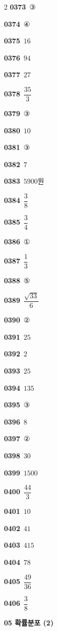 \documentclass[10pt,a4paper]{article}
\begin{document}
\begin{multicols}{2}
\noindent\textbf{0373}\ ③\par
\noindent\textbf{0374}\ ④\par
\noindent\textbf{0375}\ $16$\par
\noindent\textbf{0376}\ $94$\par
\noindent\textbf{0377}\ $27$\par
\noindent\textbf{0378}\ $\dfrac{35}{3}$\par
\noindent\textbf{0379}\ ③\par
\noindent\textbf{0380}\ $10$\par
\noindent\textbf{0381}\ ③\par
\noindent\textbf{0382}\ $7$\par
\noindent\textbf{0383}\ $5900$원\par
\noindent\textbf{0384}\ $\dfrac{3}{8}$\par
\noindent\textbf{0385}\ $\dfrac{3}{4}$\par
\noindent\textbf{0386}\ ①\par
\noindent\textbf{0387}\ $\dfrac{1}{3}$\par
\noindent\textbf{0388}\ ⑤\par
\noindent\textbf{0389}\ $\dfrac{\sqrt{33}}{6}$\par
\noindent\textbf{0390}\ ②\par
\noindent\textbf{0391}\ $25$\par
\noindent\textbf{0392}\ $2$\par
\noindent\textbf{0393}\ $25$\par
\noindent\textbf{0394}\ $135$\par
\noindent\textbf{0395}\ ③\par
\noindent\textbf{0396}\ $8$\par
\noindent\textbf{0397}\ ②\par
\noindent\textbf{0398}\ $30$\par
\noindent\textbf{0399}\ $1500$\par
\noindent\textbf{0400}\ $\dfrac{44}{3}$\par
\noindent\textbf{0401}\ $10$\par
\noindent\textbf{0402}\ $41$\par
\noindent\textbf{0403}\ $415$\par
\noindent\textbf{0404}\ $78$\par
\noindent\textbf{0405}\ $\dfrac{49}{36}$\par
\noindent\textbf{0406}\ $\dfrac{3}{8}$\par
\noindent\textbf{05 확률분포 (2)}\par\smallskip

\end{multicols}
\end{document}
